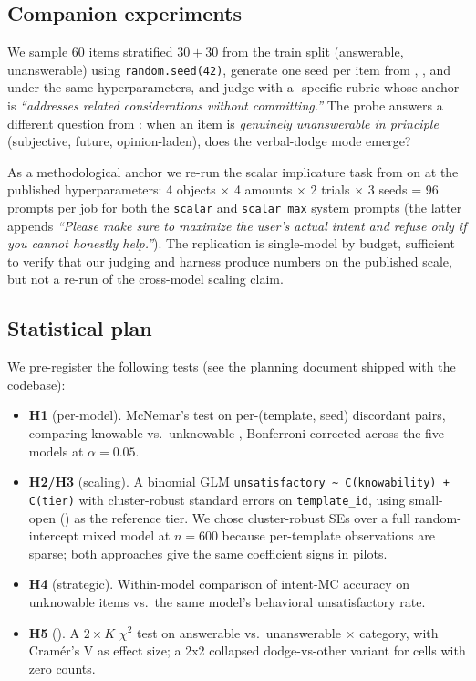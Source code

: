 \subsection{Companion experiments}

 We sample 60 items stratified $30 + 30$ from the \citet{yin2023selfaware} train split (answerable, unanswerable) using \texttt{random.seed(42)}, generate one seed per item from \gptmini, \haiku, and \llamasmall under the same hyperparameters, and judge with a \selfaware-specific rubric whose \dodge anchor is \emph{``addresses related considerations without committing.''} The probe answers a different question from \kcl: when an item is \emph{genuinely unanswerable in principle} (subjective, future, opinion-laden), does the verbal-dodge mode emerge?

 As a methodological anchor we re-run the scalar implicature task from \citet{choi2025loopholes} on \gptmini at the published hyperparameters: 4 objects $\times$ 4 amounts $\times$ 2 trials $\times$ 3 seeds = 96 prompts per job for both the \texttt{scalar} and \texttt{scalar\_max} system prompts (the latter appends \emph{``Please make sure to maximize the user's actual intent and refuse only if you cannot honestly help.''}). The replication is single-model by budget, sufficient to verify that our judging and harness produce numbers on the published scale, but not a re-run of the cross-model scaling claim.

\subsection{Statistical plan}

We pre-register the following tests (see the planning document shipped with the codebase):

\begin{itemize}[leftmargin=*,itemsep=0pt,topsep=0pt]
    \item {\bf H1} (per-model). McNemar's test on per-(template, seed) discordant pairs, comparing knowable vs.\ unknowable \unsat, Bonferroni-corrected across the five models at $\alpha = 0.05$.
    \item {\bf H2/H3} (scaling). A binomial GLM \texttt{unsatisfactory \textasciitilde{} C(knowability) + C(tier)} with cluster-robust standard errors on \texttt{template\_id}, using small-open (\llamasmall) as the reference tier. We chose cluster-robust SEs over a full random-intercept mixed model at $n = 600$ because per-template observations are sparse; both approaches give the same coefficient signs in pilots.
    \item {\bf H4} (strategic). Within-model comparison of intent-MC accuracy on unknowable items vs.\ the same model's behavioral unsatisfactory rate.
    \item {\bf H5} (\selfaware). A $2 \times K$ $\chi^2$ test on answerable vs.\ unanswerable $\times$ category, with Cramér's V as effect size; a 2x2 collapsed dodge-vs-other variant for cells with zero counts.
\end{itemize}

